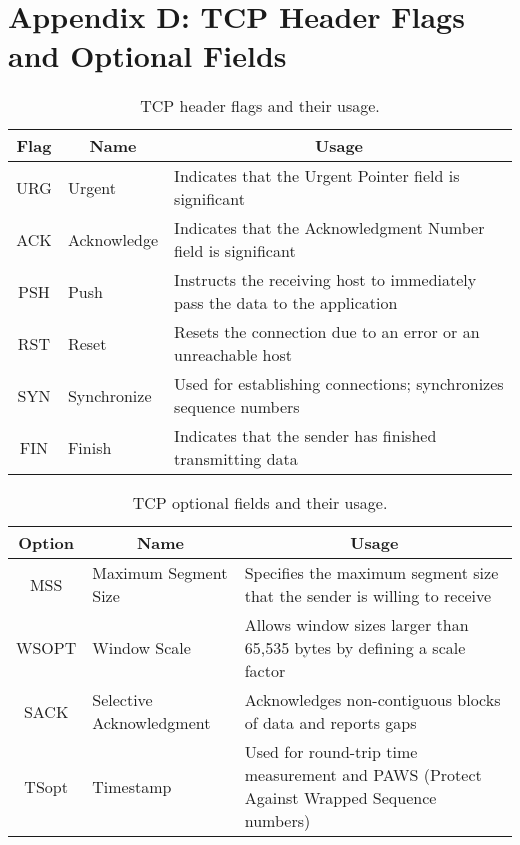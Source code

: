 \renewcommand{\thefigure}{D\arabic{figure}}
\renewcommand{\thetable}{D\arabic{table}}
\setcounter{figure}{0}
\setcounter{table}{0}

\clearpage
\section{Appendix D: TCP Header Flags and Optional Fields}
\label{appendixD}
{
\setlength{\tabcolsep}{8pt}

\begin{table}[h!]
    \centering
    \captionsetup{justification=centering}
    \begin{tabularx}{\textwidth}{clX}
        \toprule
        \textbf{Flag} & \multicolumn{1}{c}{\textbf{Name}} & \multicolumn{1}{c}{\textbf{Usage}} \\
        \midrule
        URG & Urgent & Indicates that the Urgent Pointer field is significant \\
        ACK & Acknowledge & Indicates that the Acknowledgment Number field is significant \\
        PSH & Push & Instructs the receiving host to immediately pass the data to the application \\
        RST & Reset & Resets the connection due to an error or an unreachable host \\
        SYN & Synchronize & Used for establishing connections; synchronizes sequence numbers \\
        FIN & Finish & Indicates that the sender has finished transmitting data \\
        \bottomrule
    \end{tabularx}
    \caption{TCP header flags and their usage.}
    \label{tab:tcp_header_flags}
\end{table}
}

{
\setlength{\tabcolsep}{8pt}

\begin{table}[h!]
    \centering
    \captionsetup{justification=centering}
    \begin{tabularx}{\textwidth}{clX}
        \toprule
        \textbf{Option} & \multicolumn{1}{c}{\textbf{Name}} & \multicolumn{1}{c}{\textbf{Usage}} \\
        \midrule
        MSS & Maximum Segment Size & Specifies the maximum segment size that the sender is willing to receive \\
        WSOPT & Window Scale & Allows window sizes larger than 65,535 bytes by defining a scale factor \\
        SACK & Selective Acknowledgment & Acknowledges non-contiguous blocks of data and reports gaps \\
        TSopt & Timestamp & Used for round-trip time measurement and PAWS (Protect Against Wrapped Sequence numbers) \\
        \bottomrule
    \end{tabularx}
    \caption{TCP optional fields and their usage.}
    \label{tab:tcp_optional_fields}
\end{table}
}

